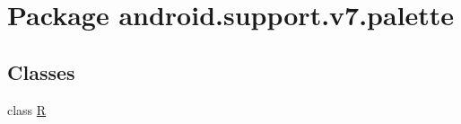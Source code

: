 \hypertarget{namespaceandroid_1_1support_1_1v7_1_1palette}{
\section{Package android.support.v7.palette}
\label{namespaceandroid_1_1support_1_1v7_1_1palette}
}
\subsection*{Classes}
\begin{CompactItemize}
\item 
class \hyperlink{classandroid_1_1support_1_1v7_1_1palette_1_1_r}{R}
\end{CompactItemize}
